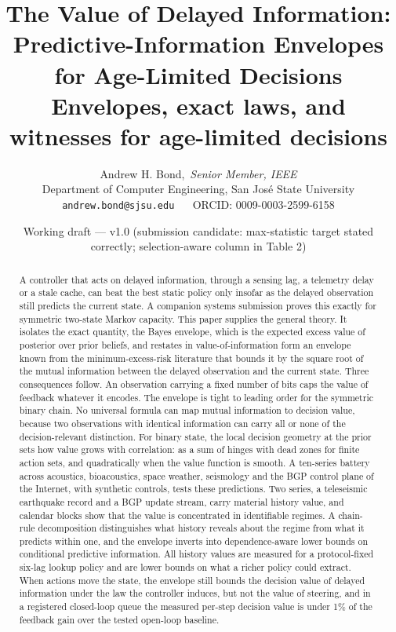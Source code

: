 \documentclass[11pt]{article}
\title{\textbf{The Value of Delayed Information:\\
Predictive-Information Envelopes for Age-Limited Decisions}\\[4pt]
\large Envelopes, exact laws, and witnesses for age-limited decisions}
\author{Andrew H. Bond,~\emph{Senior Member, IEEE}\\
Department of Computer Engineering, San Jos\'e State University\\
\texttt{andrew.bond@sjsu.edu} ~\textbar~ ORCID: 0009-0003-2599-6158}
\date{Working draft --- v1.0 (submission candidate: max-statistic target stated correctly; selection-aware column in Table 2)}
\begin{document}
\maketitle

\begin{abstract}
A controller that acts on delayed information, through a sensing lag, a
telemetry delay or a stale cache, can beat the best static policy only
insofar as the delayed observation still predicts the current state. A
companion systems submission \cite{infocom} proves this exactly for
symmetric two-state Markov capacity. This paper supplies the general
theory. It isolates the exact quantity, the Bayes envelope, which is the
expected excess value of posterior over prior beliefs, and restates in
value-of-information form an envelope known from the minimum-excess-risk
literature that bounds it by the square root of the mutual information
between the delayed observation and the current state. Three consequences
follow. An observation carrying a fixed number of bits caps the value of
feedback whatever it encodes. The envelope is tight to leading order for
the symmetric binary chain. No universal formula can map mutual
information to decision value, because two observations with identical
information can carry all or none of the decision-relevant distinction.
For binary state, the local decision geometry at the prior sets how value
grows with correlation: as a sum of hinges with dead zones for finite
action sets, and quadratically when the value function is smooth. A
ten-series battery across acoustics, bioacoustics, space weather,
seismology and the BGP control plane of the Internet, with synthetic
controls, tests these predictions. Two series, a teleseismic earthquake
record and a BGP update stream, carry material history value, and
calendar blocks show that the value is concentrated in identifiable regimes. A
chain-rule decomposition distinguishes what history reveals about the regime
from what it predicts within one, and the envelope inverts into
dependence-aware lower bounds on conditional predictive information. All
history values are measured for a protocol-fixed six-lag lookup policy and are
lower bounds on what a richer policy could extract. When actions move the
state, the envelope still bounds the decision value of delayed
information under the law the controller induces, but not the value of
steering, and in a registered closed-loop queue the measured per-step
decision value is under 1\% of the feedback gain over the tested open-loop
baseline.
\end{abstract}
\end{document}
